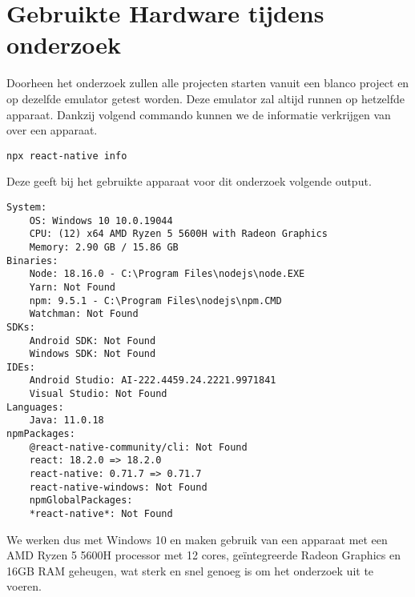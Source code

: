 \section{Gebruikte Hardware tijdens onderzoek}
Doorheen het onderzoek zullen alle projecten starten vanuit een blanco project en op dezelfde emulator 
getest worden. Deze emulator zal altijd runnen op hetzelfde apparaat. Dankzij volgend commando 
kunnen we de informatie verkrijgen van over een apparaat.
\begin{verbatim}
npx react-native info
\end{verbatim}
Deze geeft bij het gebruikte apparaat voor dit onderzoek volgende output.
\begin{verbatim}
System:
    OS: Windows 10 10.0.19044
    CPU: (12) x64 AMD Ryzen 5 5600H with Radeon Graphics
    Memory: 2.90 GB / 15.86 GB
Binaries:
    Node: 18.16.0 - C:\Program Files\nodejs\node.EXE
    Yarn: Not Found
    npm: 9.5.1 - C:\Program Files\nodejs\npm.CMD
    Watchman: Not Found
SDKs:
    Android SDK: Not Found
    Windows SDK: Not Found
IDEs:
    Android Studio: AI-222.4459.24.2221.9971841
    Visual Studio: Not Found
Languages:
    Java: 11.0.18
npmPackages:
    @react-native-community/cli: Not Found
    react: 18.2.0 => 18.2.0 
    react-native: 0.71.7 => 0.71.7 
    react-native-windows: Not Found
    npmGlobalPackages:
    *react-native*: Not Found
\end{verbatim}
We werken dus met Windows 10 en maken gebruik van een apparaat met een AMD Ryzen 5 5600H processor 
met 12 cores, geïntegreerde Radeon Graphics en 16GB RAM geheugen, wat sterk en snel 
genoeg is om het onderzoek uit te voeren.










